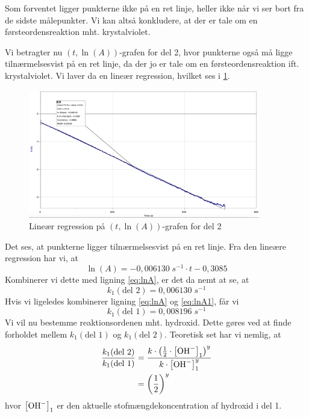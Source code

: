 \documentclass{report}
\begin{document}
Som forventet ligger punkterne ikke på en ret linje, heller ikke når vi ser bort fra de sidste målepunkter.
Vi kan altså konkludere, at der er tale om en førsteordensreaktion mht. krystalviolet.

Vi betragter nu $(t, \ln(A))$-grafen for del 2, hvor punkterne også må ligge tilnærmelsesvist på en ret linje, da der jo er tale om en førsteordensreaktion ift. krystalviolet.
Vi laver da en lineær regression, hvilket ses i \cref{fig:tlnA2}.
\begin{figure}[H]
\begin{center}
  \includegraphics[width=0.9\textwidth]{tlnA2.png}
\end{center}
\caption{Lineær regression på $(t,\ln\left(A\right)) $-grafen for del 2}
\label{fig:tlnA2}
\end{figure}
Det ses, at punkterne ligger tilnærmelsesvist på en ret linje.
Fra den lineære regression har vi, at 
\[
\ln(A)=-0,006130 \;\unit{s ^{-1}} \cdot t -0,3085
\] 
Kombinerer vi dette med ligning \ref{eq:lnA}, er det da nemt at se, at
\[
k_1(\text{del 2} )=0,006130 \;\unit{s ^{-1}} 
\] 
Hvis vi ligeledes kombinerer ligning \ref{eq:lnA} og \ref{eq:lnA1}, får vi 
\[
k_1(\text{del 1} )=0,008196 \;\unit{s ^{-1}} 
\] 
Vi vil nu bestemme reaktionsordenen mht. hydroxid.
Dette gøres ved at finde forholdet mellem $k_1(\text{del 1} )$ og $k_1(\text{del 2} )$.
Teoretisk set har vi nemlig, at 
\begin{equation*}
\begin{split}
  \frac{k_1(\text{del 2} )}{k_1(\text{del 1} )}&=\frac{k \cdot \left(\frac{1}{2} \cdot \left[\ce{OH-} \right]_1\right) ^{y}}{k \cdot \left[\ce{OH-} \right]_1^{y}}\\
  &=\left(\frac{1}{2}\right) ^{y}
\end{split}
\end{equation*}
hvor $\left[\ce{OH-} \right]_1$ er den aktuelle stofmængdekoncentration af hydroxid i del 1. 
\end{document}
